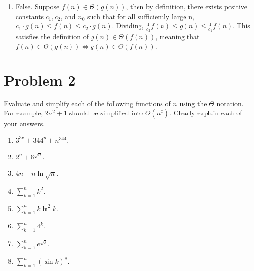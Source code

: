 \begin{enumerate}
    \item False. Suppose $f(n) \in \Theta(g(n))$, then by definition, there exists positive constants $c_1, c_2$, and $n_0$ such that for all sufficiently large n, $c_1 \cdot g(n) \le f(n) \le c_2 \cdot g(n)$. Dividing, $\frac{1}{c_2} f(n) \le g(n) \le \frac{1}{c_1} f(n)$. This satisfies the definition of $g(n) \in \Theta(f(n))$, meaning that $f(n) \in \Theta(g(n)) \iff g(n) \in \Theta(f(n))$.  
\end{enumerate}

\section*{Problem 2}
Evaluate and simplify each of the following functions of $n$ using the $\Theta$ notation. For example, $2n^2 + 1$ should be simplified into $\Theta(n^2)$. Clearly explain each of your answers.
\begin{enumerate}
    \item $3^{3n} + 344^n + n^{344}$.
    \item $2^{n} + 6^{\sqrt{n}}$.
    \item $4n + n \ln \sqrt{n}$.
    \item $\sum_{k = 1}^{n} k^2$.
    \item $\sum_{k = 1}^{n} k \ln^2 k$.
    \item $\sum_{k = 1}^{n} 4^k$.
    \item $\sum_{k = 1}^{n} e^{\sqrt{k}}$.
    \item $\sum_{k = 1}^{n} (\sin k)^8$.
\end{enumerate}

